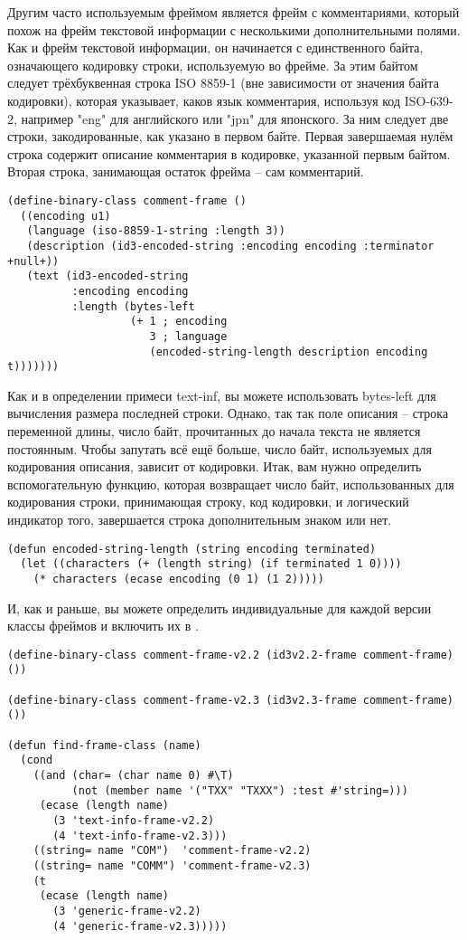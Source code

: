 Другим часто используемым фреймом является фрейм с комментариями, который похож на фрейм
текстовой информации с несколькими дополнительными полями. Как и фрейм текстовой
информации, он начинается с единственного байта, означающего кодировку строки,
используемую во фрейме. За этим байтом следует трёхбуквенная строка ISO 8859-1 (вне
зависимости от значения байта кодировки), которая указывает, каков язык комментария,
используя код ISO-639-2, например "eng" для английского или "jpn" для японского. За ним
следует две строки, закодированные, как указано в первом байте. Первая завершаемая нулём
строка содержит описание комментария в кодировке, указанной первым байтом. Вторая строка,
занимающая остаток фрейма -- сам комментарий.

\begin{lstlisting}
(define-binary-class comment-frame ()
  ((encoding u1)
   (language (iso-8859-1-string :length 3))
   (description (id3-encoded-string :encoding encoding :terminator +null+))
   (text (id3-encoded-string
          :encoding encoding
          :length (bytes-left
                   (+ 1 ; encoding
                      3 ; language
                      (encoded-string-length description encoding t)))))))
\end{lstlisting}

Как и в определении примеси text-inf, вы можете использовать bytes-left для вычисления
размера последней строки. Однако, так так поле описания -- строка переменной длины, число
байт, прочитанных до начала текста не является постоянным. Чтобы запутать всё ещё больше,
число байт, используемых для кодирования описания, зависит от кодировки. Итак, вам нужно
определить вспомогательную функцию, которая возвращает число байт, использованных для
кодирования строки, принимающая строку, код кодировки, и логический индикатор того,
завершается строка дополнительным знаком или нет.

\begin{lstlisting}
(defun encoded-string-length (string encoding terminated)
  (let ((characters (+ (length string) (if terminated 1 0))))
    (* characters (ecase encoding (0 1) (1 2)))))
\end{lstlisting}

И, как и раньше, вы можете определить индивидуальные для каждой версии классы фреймов и
включить их в .

\begin{lstlisting}
(define-binary-class comment-frame-v2.2 (id3v2.2-frame comment-frame) ())

(define-binary-class comment-frame-v2.3 (id3v2.3-frame comment-frame) ())

(defun find-frame-class (name)
  (cond
    ((and (char= (char name 0) #\T)
          (not (member name '("TXX" "TXXX") :test #'string=)))
     (ecase (length name)
       (3 'text-info-frame-v2.2)
       (4 'text-info-frame-v2.3)))
    ((string= name "COM")  'comment-frame-v2.2)
    ((string= name "COMM") 'comment-frame-v2.3)
    (t
     (ecase (length name)
       (3 'generic-frame-v2.2)
       (4 'generic-frame-v2.3)))))
\end{lstlisting}

